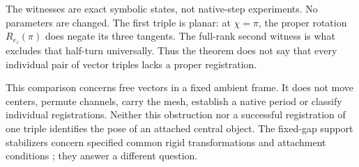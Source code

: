 The witnesses are exact symbolic states, not native-step experiments. No parameters are changed. The first triple is planar: at \(\chi=\pi\), the proper rotation \(R_{e_z}(\pi)\) does negate its three tangents. The full-rank second witness is what excludes that half-turn universally. Thus the theorem does not say that every individual pair of vector triples lacks a proper registration.

This comparison concerns free vectors in a fixed ambient frame. It does not move centers, permute channels, carry the mesh, establish a native period or classify individual registrations. Neither this obstruction nor a successful registration of one triple identifies the pose of an attached central object. The fixed-gap support stabilizers concern specified common rigid transformations and attachment conditions \cite[Section 3]{fixedgap}; they answer a different question.

